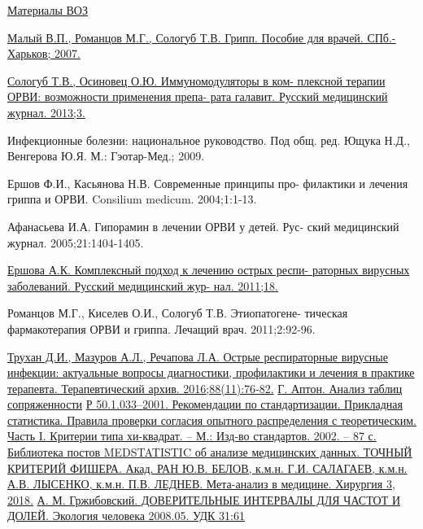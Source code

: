 \documentclass{article}
\begin{document}
\newpage
{}
\begin{thebibliography}{}
\href{http://www.who.int/mediacentre/factsheets/fs211/ru/}{Материалы ВОЗ}

\href{http://medi.ru/doc/a210207.html}{Малый В.П., Романцов М.Г., Сологуб Т.В. Грипп. Пособие для врачей. СПб.-Харьков; 2007.}

\href{http://www.rmj.ru/arti- cles_8613.html}{Сологуб Т.В., Осиновец О.Ю. Иммуномодуляторы в ком- плексной терапии ОРВИ: возможности применения препа- рата галавит. Русский медицинский журнал. 2013;3.}

{Инфекционные болезни: национальное руководство. Под общ. ред. Ющука Н.Д., Венгерова Ю.Я. М.: Гэотар-Мед.; 2009.}

{Ершов Ф.И., Касьянова Н.В. Современные принципы про- филактики и лечения гриппа и ОРВИ. Consilium medicum. 2004;1:1-13.}

{Афанасьева И.А. Гипорамин в лечении ОРВИ у детей. Рус- ский медицинский журнал. 2005;21:1404-1405.}

\href{http://rmj.ru/articles_7807.htm}{Ершова А.К. Комплексный подход к лечению острых респи- раторных вирусных заболеваний. Русский медицинский жур- нал. 2011;18.}

{Романцов М.Г., Киселев О.И., Сологуб Т.В. Этиопатогене- тическая фармакотерапия ОРВИ и гриппа. Лечащий врач. 2011;2:92-96.}

 \href{https://www.mediasphera.ru/issues/terapevticheskij-arkhiv/2016/11/1004036602016111076}{Трухан Д.И., Мазуров А.Л., Речапова Л.А. Острые респираторные вирусные инфекции: актуальные вопросы диагностики, профилактики и лечения в практике терапевта. Терапевтический архив. 2016;88(11):76‑82.}
     \href{http://www.machinelearning.ru/wiki/index.php?title=Таблица_сопряженности}{Г. Аптон. Анализ таблиц сопряженности}
     \href{https://ami.nstu.ru/~headrd/seminar/xi_square/start1.htm}{Р 50.1.033–2001. Рекомендации по стандартизации. Прикладная статистика. Правила проверки согласия опытного распределения с теоретическим. Часть I. Критерии типа хи-квадрат. – М.: Изд-во стандартов. 2002. – 87 с.}
     \href{https://medstatistic.ru/methods/methods5.html}{Библиотека постов MEDSTATISTIC об анализе медицинских данных. ТОЧНЫЙ КРИТЕРИЙ ФИШЕРА. }
     \href{https://doi.org/10.17116/hirurgia201834-15}{Акад. РАН Ю.В. БЕЛОВ, к.м.н. Г.И. САЛАГАЕВ, к.м.н. А.В. ЛЫСЕНКО, к.м.н. П.В. ЛЕДНЕВ. Мета-анализ в медицине. Хирургия 3, 2018.}
     \href{http://medstatistic.ru/articles/doveritelnye-intervaly-dlya-chastot-i-doley.pdf}{А. М. Гржибовский. ДОВЕРИТЕЛЬНЫЕ ИНТЕРВАЛЫ ДЛЯ ЧАСТОТ И ДОЛЕЙ. Экология человека 2008.05. УДК 31:61}
\end{thebibliography}
\end{document}
